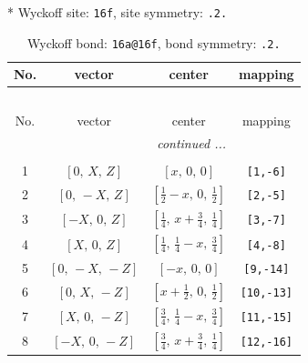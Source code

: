 \documentclass[fleqn,8pt]{jsarticle}
\begin{document}
* Wyckoff site: {\tt 16f}, site symmetry: {\tt .2.}
\renewcommand{\arraystretch}{1.2}
\begin{longtable}{cccc}
\caption{Wyckoff bond: {\tt 16a@16f}, bond symmetry: {\tt .2.}}
 \\
 \hline \hline
No. & vector & center & mapping \\ \hline \endfirsthead

\multicolumn{3}{l}{\tablename\ \thetable{}} \\
 \hline \hline
No. & vector & center & mapping \\ \hline \endhead

 \hline \hline
\multicolumn{3}{r}{\footnotesize\it continued ...} \\ \endfoot

 \hline \hline
\multicolumn{3}{r}{} \\ \endlastfoot

1 & $\left[ 0,\, X,\, Z \right]$ & $\left[ x,\, 0,\, 0 \right]$ & {\tt [1,-6]} \\ \hline
2 & $\left[ 0,\, - X,\, Z \right]$ & $\left[ \frac{1}{2} - x,\, 0,\, \frac{1}{2} \right]$ & {\tt [2,-5]} \\ \hline
3 & $\left[ - X,\, 0,\, Z \right]$ & $\left[ \frac{1}{4},\, x + \frac{3}{4},\, \frac{1}{4} \right]$ & {\tt [3,-7]} \\ \hline
4 & $\left[ X,\, 0,\, Z \right]$ & $\left[ \frac{1}{4},\, \frac{1}{4} - x,\, \frac{3}{4} \right]$ & {\tt [4,-8]} \\ \hline
5 & $\left[ 0,\, - X,\, - Z \right]$ & $\left[ - x,\, 0,\, 0 \right]$ & {\tt [9,-14]} \\ \hline
6 & $\left[ 0,\, X,\, - Z \right]$ & $\left[ x + \frac{1}{2},\, 0,\, \frac{1}{2} \right]$ & {\tt [10,-13]} \\ \hline
7 & $\left[ X,\, 0,\, - Z \right]$ & $\left[ \frac{3}{4},\, \frac{1}{4} - x,\, \frac{3}{4} \right]$ & {\tt [11,-15]} \\ \hline
8 & $\left[ - X,\, 0,\, - Z \right]$ & $\left[ \frac{3}{4},\, x + \frac{3}{4},\, \frac{1}{4} \right]$ & {\tt [12,-16]} \\
\end{longtable}
\renewcommand{\arraystretch}{1.2}
\end{document}
